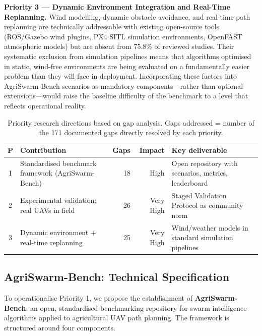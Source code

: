 \documentclass[review,3p,times]{elsarticle}
\begin{document}
\textbf{Priority 3 --- Dynamic Environment Integration and Real-Time Replanning.} Wind modelling, dynamic obstacle avoidance, and real-time path replanning are technically addressable with existing open-source tools (ROS/Gazebo wind plugins, PX4 SITL simulation environments, OpenFAST atmospheric models) but are absent from 75.8\% of reviewed studies. Their systematic exclusion from simulation pipelines means that algorithms optimised in static, wind-free environments are being evaluated on a fundamentally easier problem than they will face in deployment. Incorporating these factors into AgriSwarm-Bench scenarios as mandatory components---rather than optional extensions---would raise the baseline difficulty of the benchmark to a level that reflects operational reality.

\begin{table}[htbp]
\centering
\caption{Priority research directions based on gap analysis. Gaps addressed = number of the 171 documented gaps directly resolved by each priority.}
\label{tab:priorities}
\begin{tabularx}{\textwidth}{clrrX}
\toprule
\textbf{P} & \textbf{Contribution} & \textbf{Gaps} & \textbf{Impact} & \textbf{Key deliverable} \\
\midrule
1 & Standardised benchmark framework (AgriSwarm-Bench) & 18 & High & Open repository with scenarios, metrics, leaderboard \\
2 & Experimental validation: real UAVs in field & 26 & Very High & Staged Validation Protocol as community norm \\
3 & Dynamic environment + real-time replanning & 25 & Very High & Wind/weather models in standard simulation pipelines \\
\bottomrule
\end{tabularx}
\end{table}

\subsection{AgriSwarm-Bench: Technical Specification}

To operationalise Priority 1, we propose the establishment of \textbf{AgriSwarm-Bench}: an open, standardised benchmarking repository for swarm intelligence algorithms applied to agricultural UAV path planning. The framework is structured around four components.
\end{document}
